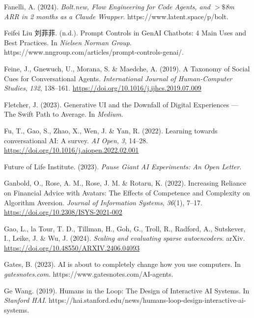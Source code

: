 \documentclass[
  letterpaper,
  DIV=11,
  numbers=noendperiod]{scrartcl}
\newlength{\cslhangindent}
\newenvironment{CSLReferences}[2] %
 {\begin{list}{}{%
  \setlength{\itemindent}{0pt}
  \setlength{\leftmargin}{0pt}
  \setlength{\parsep}{0pt}
  \ifodd #1
   \setlength{\leftmargin}{\cslhangindent}
   \setlength{\itemindent}{-1\cslhangindent}
  \fi
  \setlength{\itemsep}{#2\baselineskip}}}
 {\end{list}}
\begin{document}
\begin{CSLReferences}{1}{0}
Fanelli, A. (2024). \emph{Bolt.new, {Flow Engineering} for {Code
Agents}, and {\(>\$\)}8m {ARR} in 2 months as a {Claude Wrapper}}.
https://www.latent.space/p/bolt.

Feifei Liu 刘菲菲. (n.d.). Prompt {Controls} in {GenAI Chatbots}: 4
{Main Uses} and {Best Practices}. In \emph{Nielsen Norman Group}.
https://www.nngroup.com/articles/prompt-controls-genai/.

Feine, J., Gnewuch, U., Morana, S. \& Maedche, A. (2019). A {Taxonomy}
of {Social Cues} for {Conversational Agents}. \emph{International
Journal of Human-Computer Studies}, \emph{132}, 138--161.
\url{https://doi.org/10.1016/j.ijhcs.2019.07.009}

Fletcher, J. (2023). Generative {UI} and the {Downfall} of {Digital
Experiences} --- {The Swift Path} to {Average}. In \emph{Medium}.

Fu, T., Gao, S., Zhao, X., Wen, J. \& Yan, R. (2022). Learning towards
conversational {AI}: {A} survey. \emph{AI Open}, \emph{3}, 14--28.
\url{https://doi.org/10.1016/j.aiopen.2022.02.001}

Future of Life Institute. (2023). \emph{Pause {Giant AI Experiments}:
{An Open Letter}}.

Ganbold, O., Rose, A. M., Rose, J. M. \& Rotaru, K. (2022). Increasing
{Reliance} on {Financial Advice} with {Avatars}: {The Effects} of
{Competence} and {Complexity} on {Algorithm Aversion}. \emph{Journal of
Information Systems}, \emph{36}(1), 7--17.
\url{https://doi.org/10.2308/ISYS-2021-002}

Gao, L., la Tour, T. D., Tillman, H., Goh, G., Troll, R., Radford, A.,
Sutskever, I., Leike, J. \& Wu, J. (2024). \emph{Scaling and evaluating
sparse autoencoders}. arXiv.
\url{https://doi.org/10.48550/ARXIV.2406.04093}

Gates, B. (2023). {AI} is about to completely change how you use
computers. In \emph{gatesnotes.com}.
https://www.gatesnotes.com/AI-agents.

Ge Wang. (2019). Humans in the {Loop}: {The Design} of {Interactive AI
Systems}. In \emph{Stanford HAI}.
https://hai.stanford.edu/news/humans-loop-design-interactive-ai-systems.


\end{CSLReferences}
\end{document}
